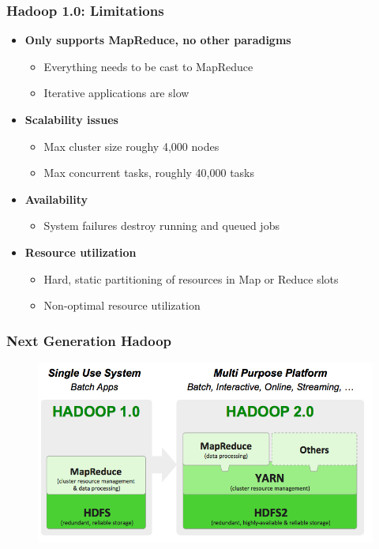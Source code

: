 \begin{frame}
\frametitle{Hadoop 1.0: Limitations}
\begin{itemize}
  \item {\bf Only supports MapReduce, no other paradigms}
  \begin{itemize}
    \item Everything needs to be cast to MapReduce
    \item Iterative applications are slow
  \end{itemize}

\vspace{10pt}

  \item {\bf Scalability issues}
  \begin{itemize}
    \item Max cluster size roughy 4,000 nodes
    \item Max concurrent tasks, roughly 40,000 tasks
  \end{itemize}

\vspace{10pt}

  \item {\bf Availability}
  \begin{itemize}
    \item System failures destroy running and queued jobs
  \end{itemize}

\vspace{10pt}

  \item {\bf Resource utilization}
  \begin{itemize}
    \item Hard, static partitioning of resources in Map or Reduce slots
    \item Non-optimal resource utilization
  \end{itemize}
\end{itemize}
\end{frame}

\begin{frame}
\frametitle{Next Generation Hadoop}
\begin{figure}[h]
  \centering
  \includegraphics[scale=0.4]{./figures/yarn_vision}
  \label{fig:yarn_vision}
\end{figure}
\end{frame}

